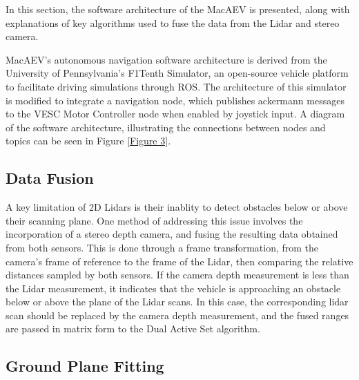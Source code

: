 \documentclass[conference]{IEEEtran}
\begin{document}
In this section, the software architecture of the MacAEV is presented, along with explanations of key algorithms used to fuse the data from the Lidar and stereo camera. 

MacAEV's autonomous navigation software architecture is derived from the University of Pennsylvania's F1Tenth Simulator, an open-source vehicle platform to facilitate driving simulations through ROS. The architecture of this simulator is modified to integrate a navigation node, which publishes ackermann messages to the VESC Motor Controller node when enabled by joystick input. A diagram of the software architecture, illustrating the connections between nodes and topics can be seen in Figure \ref{Figure 3}.









\subsection{Data Fusion}

A key limitation of 2D Lidars is their inablity to detect obstacles below or above their scanning plane. One method of addressing this issue involves the incorporation of a stereo depth camera, and fusing the resulting data obtained from both sensors. This is done through a frame transformation, from the camera's frame of reference to the frame of the Lidar, then comparing the relative distances sampled by both sensors. If the camera depth measurement is less than the Lidar measurement, it indicates that the vehicle is approaching an obstacle below or above the plane of the Lidar scans. In this case, the corresponding lidar scan should be replaced by the camera depth measurement, and the fused ranges are passed in matrix form to the Dual Active Set algorithm. 






\subsection{Ground Plane Fitting}
\end{document}
